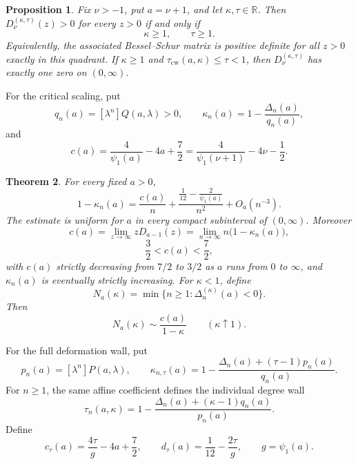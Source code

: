 \documentclass[11pt,a4paper]{amsart}
\numberwithin{equation}{section}
\theoremstyle{plain}
\newtheorem{theorem}{Theorem}[section]
\newtheorem{proposition}[theorem]{Proposition}
\theoremstyle{definition}
\newcommand{\R}{\mathbb R}
\begin{document}
\begin{proposition}\label{prop:bessel-sharpness}
Fix \(\nu>-1\), put \(a=\nu+1\), and let \(\kappa,\tau\in\R\).  Then
\(D_\nu^{(\kappa,\tau)}(z)>0\) for every \(z>0\) if and only if
\[
 \kappa\ge1,\qquad \tau\ge1.
\]
Equivalently, the associated Bessel--Schur matrix is positive definite for all
\(z>0\) exactly in this quadrant.  If \(\kappa\ge1\) and
\(\tau_{\mathrm{cw}}(a,\kappa)\le\tau<1\), then
\(D_\nu^{(\kappa,\tau)}\) has exactly one zero on \((0,\infty)\).
\end{proposition}

For the critical scaling, put
\begin{equation}\label{eq:qndef}
 q_n(a)=[\lambda^n]Q(a,\lambda)>0,
 \qquad
 \kappa_n(a)=1-\frac{\Delta_n(a)}{q_n(a)},
\end{equation}
and
\begin{equation}\label{eq:c-critical}
 c(a)=\frac4{\psi_1(a)}-4a+\frac72
 =\frac4{\psi_1(\nu+1)}-4\nu-\frac12.
\end{equation}

\begin{theorem}\label{thm:critical-scaling}
For every fixed \(a>0\),
\begin{equation}\label{eq:kappa-n-two-term}
 1-\kappa_n(a)
 =\frac{c(a)}n
 +\frac{\frac1{12}-\frac2{\psi_1(a)}}{n^2}
 +O_a(n^{-3}).
\end{equation}
The estimate is uniform for \(a\) in every compact subinterval of
\((0,\infty)\).  Moreover
\begin{equation}\label{eq:critical-constant-match}
 c(a)
 =\lim_{z\to\infty}zD_{a-1}(z)
 =\lim_{n\to\infty}n\bigl(1-\kappa_n(a)\bigr),
\end{equation}
\begin{equation}\label{eq:c-range}
 \frac32<c(a)<\frac72,
\end{equation}
with \(c(a)\) strictly decreasing from \(7/2\) to \(3/2\) as \(a\) runs from
\(0\) to \(\infty\), and \(\kappa_n(a)\) is eventually strictly increasing.  For \(\kappa<1\), define
\[
 N_a(\kappa)=\min\{n\ge1:\Delta_n^{(\kappa)}(a)<0\}.
\]
Then
\begin{equation}\label{eq:first-negative-asymptotic}
 N_a(\kappa)\sim\frac{c(a)}{1-\kappa}
 \qquad(\kappa\uparrow1).
\end{equation}
\end{theorem}

For the full deformation wall, put
\begin{equation}\label{eq:kappa-n-tau-def}
 p_n(a)=[\lambda^n]P(a,\lambda),
 \qquad
 \kappa_{n,\tau}(a)
 =1-\frac{\Delta_n(a)+(\tau-1)p_n(a)}{q_n(a)}.
\end{equation}
For \(n\ge1\), the same affine coefficient defines the individual degree wall
\begin{equation}\label{eq:coefficient-wall}
 \tau_n(a,\kappa)
 =1-\frac{\Delta_n(a)+(\kappa-1)q_n(a)}{p_n(a)}.
\end{equation}
Define
\begin{equation}\label{eq:c-d-tau}
 c_\tau(a)=\frac{4\tau}{g}-4a+\frac72,
 \qquad
 d_\tau(a)=\frac1{12}-\frac{2\tau}{g},
 \qquad g=\psi_1(a).
\end{equation}
\end{document}
